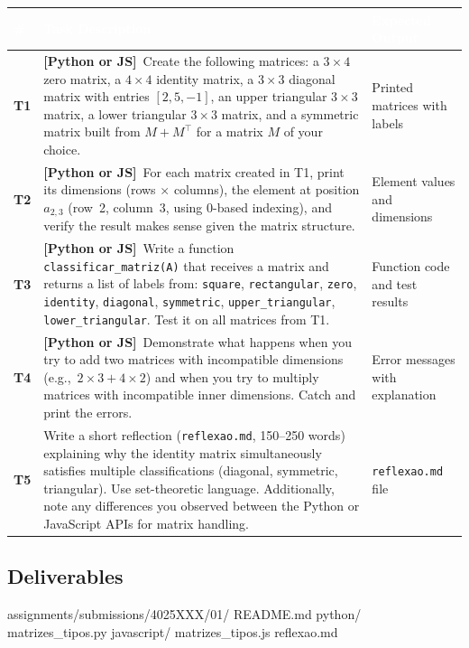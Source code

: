 \documentclass[a4paper,11pt]{article}
\newcommand{\bothlabel}{\textcolor{ippblue}{\textbf{[Python or JS]}}}
\begin{document}
\renewcommand{\arraystretch}{1.3}
\begin{tabularx}{\textwidth}{
  >{\centering\bfseries\cellcolor{lightblue}}p{0.8cm}
  X
  p{3.5cm}
}
\toprule
\rowcolor{ippblue}
\textcolor{white}{\#} & \textcolor{white}{\textbf{Task Description}} & \textcolor{white}{\textbf{Expected Output}} \\
\midrule
T1 & \bothlabel\ Create the following matrices: a $3 \times 4$ zero matrix, a $4 \times 4$ identity matrix, a $3 \times 3$ diagonal matrix with entries $[2, 5, -1]$, an upper triangular $3 \times 3$ matrix, a lower triangular $3 \times 3$ matrix, and a symmetric matrix built from $M + M^\top$ for a matrix $M$ of your choice. & Printed matrices with labels \\
\rowcolor{lightgray}
T2 & \bothlabel\ For each matrix created in T1, print its dimensions (rows $\times$ columns), the element at position $a_{2,3}$ (row~2, column~3, using 0-based indexing), and verify the result makes sense given the matrix structure. & Element values and dimensions \\
T3 & \bothlabel\ Write a function \texttt{classificar\_matriz(A)} that receives a matrix and returns a list of labels from: \texttt{square}, \texttt{rectangular}, \texttt{zero}, \texttt{identity}, \texttt{diagonal}, \texttt{symmetric}, \texttt{upper\_triangular}, \texttt{lower\_triangular}. Test it on all matrices from T1. & Function code and test results \\
\rowcolor{lightgray}
T4 & \bothlabel\ Demonstrate what happens when you try to add two matrices with incompatible dimensions (e.g.,\ $2 \times 3 + 4 \times 2$) and when you try to multiply matrices with incompatible inner dimensions. Catch and print the errors. & Error messages with explanation \\
T5 & Write a short reflection (\texttt{reflexao.md}, 150--250 words) explaining why the identity matrix simultaneously satisfies multiple classifications (diagonal, symmetric, triangular). Use set-theoretic language. Additionally, note any differences you observed between the Python or JavaScript APIs for matrix handling. & \texttt{reflexao.md} file \\
\bottomrule
\end{tabularx}

\subsection{Deliverables}

\begin{code}
assignments/submissions/4025XXX/01/
  README.md
  python/
    matrizes_tipos.py
  javascript/
    matrizes_tipos.js
  reflexao.md
\end{code}
\end{document}
